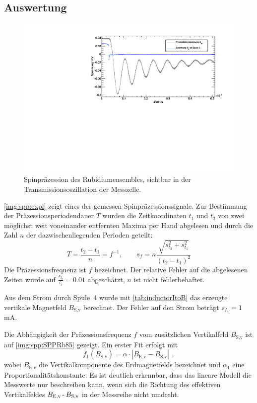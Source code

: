 \subsection{Auswertung}
\begin{figure}[H]
\begin{center}
  \includegraphics[width=\textwidth]{../img/part4/02-63-7mA-087mA.pdf}
  \caption{Spinpräzession des Rubidiumensembles, sichtbar in der Transmissionsoszillation der Messzelle.} %
  \label{img:spp:expl}
\end{center}
\end{figure} 


\autoref{img:spp:expl} zeigt eines der gemessen Spinpräzessionssignale.
Zur Bestimmung der Präzessionsperiodendauer $T$ wurden die Zeitkoordinaten $t_1$ und $t_2$
von zwei möglichst weit voneinander entfernten Maxima per Hand abgelesen und durch
die Zahl $n$ der dazwischenliegenden Perioden geteilt:
\begin{equation}
  T=\frac{t_2-t_1}{n}=f^{-1}, \qquad s_f = n \frac{\sqrt{s_{t_2}^2 + s_{t_1}^2}}{ \left( t_2 -t_1 \right)^2 }
\end{equation}
Die Präzessionsfrequenz ist $f$ bezeichnet.
Der relative Fehler auf die abgelesenen Zeiten wurde auf $\frac{s_{t_i}}{t_i}=0.01$ abgeschätzt,
$n$ ist nicht fehlerbehaftet.

Aus dem Strom durch Spule~4 wurde mit \autoref{tab:inductorItoB} das erzeugte vertikale Magnetfeld
$B_\text{S,v}$ berechnet. Der Fehler auf den Strom beträgt $s_{I_4}=1$\,mA.

Die Abhängigkeit der Präzessionsfrequenz $f$ vom zusätzlichen Vertikalfeld $B_\text{S,v}$ ist auf
\autoref{img:spp:SPPRb85} gezeigt.
Ein erster Fit erfolgt mit
\begin{equation}
  f_1(B_\text{S,v})=\alpha \cdot |B_\text{E,v}-B_\text{S,v}| \ \, ,
\end{equation}
wobei $B_\text{E,v}$ die Vertikalkomponente des Erdmagnetfelds bezeichnet und
$\alpha_1$ eine Proportionalitätskonstante.
Es ist deutlich erkennbar, dass das lineare Modell die Messwerte nur beschreiben kann,
wenn sich die Richtung des effektiven Vertikalfeldes
$B_\text{E,v} \text{\,-\,} B_\text{S,v}$ in der Messreihe nicht umdreht.

